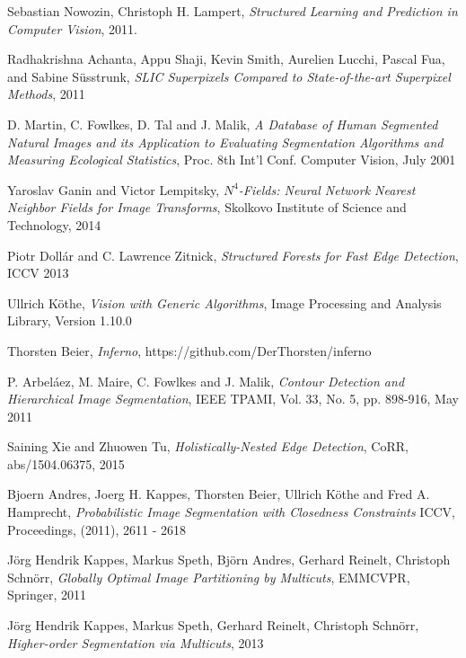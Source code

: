 \documentclass{beamer}
\begin{document}
\tiny{ }
\begin{thebibliography}{9}

  Sebastian Nowozin, Christoph H. Lampert,
  \emph{Structured Learning and Prediction in Computer Vision},
  2011.
  
  Radhakrishna Achanta, Appu Shaji, Kevin Smith, Aurelien Lucchi, Pascal Fua, and Sabine Süsstrunk, 
  \emph{SLIC Superpixels Compared to State-of-the-art Superpixel Methods},
  2011
  
	D. Martin, C. Fowlkes, D. Tal and J. Malik,
	\emph{A Database of Human Segmented Natural Images and its
	           Application to Evaluating Segmentation Algorithms and
	           Measuring Ecological Statistics},
	Proc. 8th Int'l Conf. Computer Vision,
	July 2001		
	
	Yaroslav Ganin and Victor Lempitsky,
	\emph{$N^4$-Fields: Neural Network Nearest Neighbor Fields for Image Transforms},
	Skolkovo Institute of Science and Technology,
	2014
	
  Piotr Dollár and C. Lawrence Zitnick,
  \emph{Structured Forests for Fast Edge Detection},
  ICCV 2013
  
 	Ullrich Köthe,
 	\emph{Vision with Generic Algorithms},
 	Image Processing and Analysis Library,
 	Version 1.10.0
 	
 	Thorsten Beier, 
 	\emph{Inferno}, 
 	https://github.com/DerThorsten/inferno
 	
 	P. Arbeláez, M. Maire, C. Fowlkes and J. Malik, 
 	\emph{Contour Detection and Hierarchical Image Segmentation},
 	IEEE TPAMI, Vol. 33, No. 5, pp. 898-916, May 2011
 	
 	Saining Xie and Zhuowen Tu,
 	\emph{Holistically-Nested Edge Detection},
 	CoRR, abs/1504.06375, 2015
 
 	Bjoern Andres, Joerg H. Kappes, Thorsten Beier, Ullrich Köthe and Fred A. Hamprecht, 
	\emph{Probabilistic Image Segmentation with Closedness Constraints}
	ICCV, Proceedings, (2011), 2611 - 2618
	
	
 	Jörg Hendrik Kappes, Markus Speth, Björn Andres, Gerhard Reinelt, Christoph Schnörr, 
 	\emph{Globally Optimal Image Partitioning by Multicuts},
 	EMMCVPR, Springer, 2011
 	
	
 	Jörg Hendrik Kappes, Markus Speth, Gerhard Reinelt, Christoph Schnörr, 
 	\emph{Higher-order Segmentation via Multicuts},
 	2013
 	

\end{thebibliography}
\end{document}
